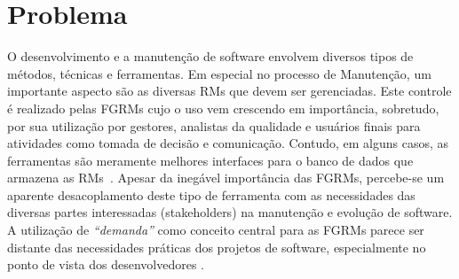 %

%

\section{Problema}
\label{sec:intro-problema}

O desenvolvimento e a manutenção de software envolvem diversos tipos de métodos,
técnicas e ferramentas. Em especial no processo de Manutenção, um importante
aspecto são as diversas RMs que devem ser gerenciadas. Este controle é realizado
pelas FGRMs cujo o uso vem crescendo em importância, sobretudo, por sua
utilização por gestores, analistas da qualidade e usuários finais para
atividades como tomada de decisão e comunicação. Contudo, em alguns casos, as
ferramentas são meramente melhores interfaces para o banco de dados que armazena
as RMs~\cite{zimmermann2009improving}. Apesar da inegável importância das FGRMs,
percebe-se um aparente desacoplamento deste tipo de ferramenta com as
necessidades das diversas partes interessadas (stakeholders) na manutenção e
evolução de software. A utilização de \textit{``demanda''} como conceito central
para as FGRMs parece ser distante das necessidades práticas dos projetos de
software, especialmente no ponto de vista dos desenvolvedores
\cite{Baysal:2013:SAP:2486788.2486957}.

